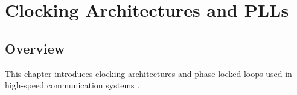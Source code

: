 \chapter{Clocking Architectures and PLLs}

\section{Overview}

This chapter introduces clocking architectures and phase-locked
loops used in high-speed communication systems
\citep{palermo2025ecen720}.





